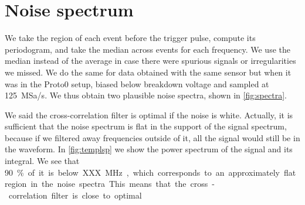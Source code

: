 \section{Noise spectrum}
\label{sec:spectrum}

We take the region of each event before the trigger pulse, compute its
periodogram, and take the median across events for each frequency. We use the
median instead of the average in case there were spurious signals or
irregularities we missed. We do the same for data obtained with the same sensor
but when it was in the Proto0 setup, biased below breakdown voltage and sampled
at \SI{125}{MSa/s}. We thus obtain two plausible noise spectra, shown in
\autoref{fig:spectra}.



\begin{figure}
    
    

\end{figure}

We said the cross-correlation filter is optimal if the noise is white.
Actually, it is sufficient that the noise spectrum is flat in the support of
the signal spectrum, because if we filtered away frequencies outside of it, all
the signal would still be in the waveform. In \autoref{fig:templsp} we show
the power spectrum of the signal and its integral. We see that \SI{90}\% of it
is below XXX~\si{MHz}, which corresponds to an approximately flat region in the
noise spectra. This means that the cross-correlation filter is close to
optimal.



\begin{figure}
    
    

\end{figure}
